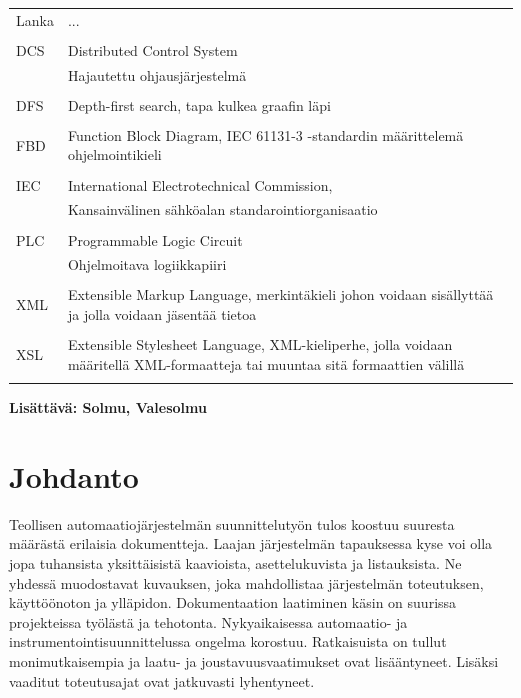 \documentclass[finnish,12pt]{article}
\begin{document}
	\begin{tabular}{ll}
Lanka	& ... \\\\
	     	    
DCS	& Distributed Control System \\
	& Hajautettu ohjausjärjestelmä \\ \\
DFS	& Depth-first search, tapa kulkea graafin läpi \\\\

FBD	& Function Block Diagram, IEC 61131-3 -standardin määrittelemä ohjelmointikieli\\\\
IEC	& International Electrotechnical Commission,\\
	& Kansainvälinen sähköalan standarointiorganisaatio\\\\
PLC	& Programmable Logic Circuit \\
	& Ohjelmoitava logiikkapiiri\\\\
XML	& Extensible Markup Language, merkintäkieli johon voidaan sisällyttää ja jolla voidaan jäsentää tietoa  \\\\
XSL	& Extensible Stylesheet Language, XML-kieliperhe, jolla voidaan määritellä XML-formaatteja tai muuntaa sitä formaattien välillä \\\\

\end{tabular}

{\bf Lisättävä:
Solmu, Valesolmu
}


	\cleardoublepage
	\storeinipagenumber
	\setcounter{page}{1}


	\section{Johdanto}
	\thispagestyle{empty}

Teollisen automaatiojärjestelmän suunnittelutyön tulos koostuu suuresta määrästä erilaisia dokumentteja.
Laajan järjestelmän tapauksessa kyse voi olla jopa tuhansista yksittäisistä kaavioista, asettelukuvista ja listauksista.
Ne yhdessä muodostavat kuvauksen, joka mahdollistaa järjestelmän toteutuksen, käyttöönoton ja ylläpidon.
Dokumentaation laatiminen käsin on suurissa projekteissa työlästä ja tehotonta.
Nykyaikaisessa automaatio- ja instrumentointisuunnittelussa ongelma korostuu.
Ratkaisuista on tullut monimutkaisempia ja laatu- ja joustavuusvaatimukset ovat lisääntyneet.
Lisäksi vaaditut toteutusajat ovat jatkuvasti lyhentyneet.
\cite{RefWorks:41}
\end{document}

